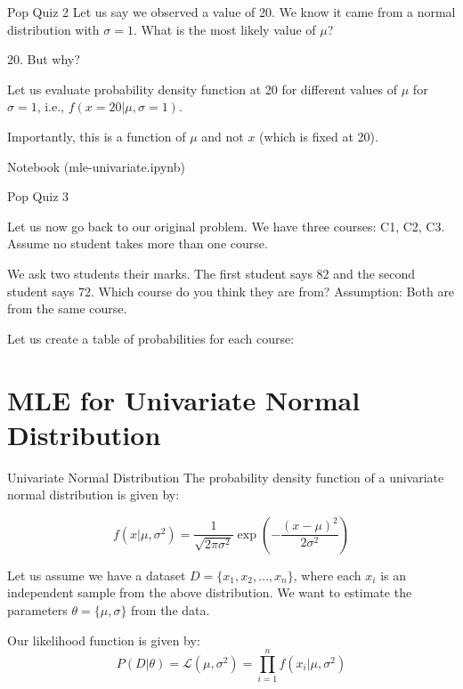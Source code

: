\documentclass[handout]{beamer}
\begin{document}
\begin{frame}{Pop Quiz 2}
    Let us say we observed a value of 20. We know it came from a normal distribution with $\sigma=1$. What is the most likely value of $\mu$?
    
    20. But why?

    Let us evaluate probability density function at 20 for different values of $\mu$ for $\sigma=1$, i.e., $f(x=20|\mu, \sigma=1)$.

    Importantly, this is a function of $\mu$ and not $x$ (which is fixed at 20).

\end{frame}

\begin{frame}
   Notebook (mle-univariate.ipynb)
\end{frame}

\begin{frame}{Pop Quiz 3}


Let us now go back to our original problem. We have three courses: C1, C2, C3. Assume no student takes more than one course.

We ask two students their marks. The first student says 82 and the second student says 72. Which course do you think they are from? Assumption: Both are from the same course.

Let us create a table of probabilities for each course:




    
\end{frame}

\section{MLE for Univariate Normal Distribution}

\begin{frame}{Univariate Normal Distribution}
The probability density function of a univariate normal distribution is given by:

\begin{equation}
f(x|\mu, \sigma^2) = \frac{1}{\sqrt{2\pi\sigma^2}}\exp\left(-\frac{(x-\mu)^2}{2\sigma^2}\right)
\end{equation}

Let us assume we have a dataset $D = \{x_1, x_2, \ldots, x_n\}$, where each $x_i$ is an independent sample from the above distribution. 
We want to estimate the parameters $\theta = \{\mu, \sigma\}$ from the data.

Our likelihood function is given by:
\begin{equation}
P(D|\theta) = \mathcal{L}(\mu, \sigma^2) = \prod_{i=1}^n f(x_i|\mu, \sigma^2)
\end{equation}


\end{frame}
\end{document}
